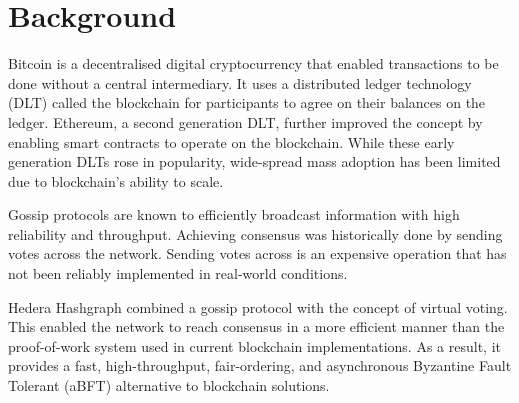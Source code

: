 \section{Background}

Bitcoin\cite{nakamoto2008peer} is a decentralised digital cryptocurrency that enabled transactions to be done without a central intermediary. It uses a distributed ledger technology (DLT) called the blockchain for participants to agree on their balances on the ledger. Ethereum\cite{wood2014ethereum}, a second generation DLT, further improved the concept by enabling smart contracts to operate on the blockchain. While these early generation DLTs rose in popularity, wide-spread mass adoption has been limited due to blockchain's ability to scale. 


Gossip protocols are known to efficiently broadcast information with high reliability and throughput\cite{birman}. Achieving consensus was historically done by sending votes across the network\cite{berman1989towards}. Sending votes across is an expensive operation that has not been reliably implemented in real-world conditions.

Hedera Hashgraph\cite{baird2016} combined a gossip protocol with the concept of virtual voting. This enabled the network to reach consensus in a more efficient manner than the proof-of-work system used in current blockchain implementations. As a result, it provides a fast, high-throughput, fair-ordering, and asynchronous Byzantine Fault Tolerant (aBFT) alternative to blockchain solutions.
